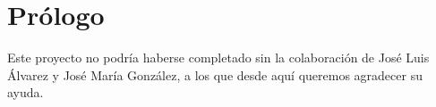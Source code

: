 \section*{Prólogo}
\label{chap:prologo}

Este proyecto no podría haberse completado sin la colaboración de José Luis Álvarez y José María González, a los que desde aquí queremos 
agradecer su ayuda.